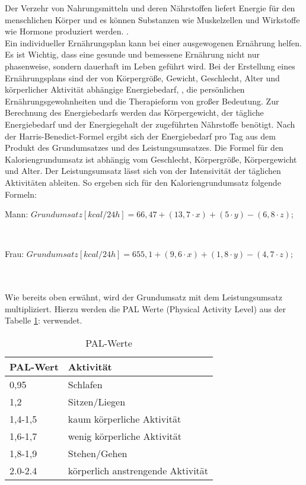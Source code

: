 		Der Verzehr von Nahrungsmitteln und deren Nährstoffen liefert Energie für den menschlichen Körper und es können Substanzen wie Muskelzellen und Wirkstoffe wie Hormone produziert werden. .\cite{ND}\\
		Ein individueller Ernährungsplan kann bei einer ausgewogenen Ernährung helfen. Es ist Wichtig, dass eine gesunde und bemessene Ernährung nicht nur phasenweise, sondern dauerhaft im Leben geführt wird. Bei der Erstellung eines Ernährungsplans sind der von Körpergröße, Gewicht, Geschlecht, Alter und körperlicher Aktivität abhängige  Energiebedarf, , die persönlichen Ernährungsgewohnheiten und die Therapieform  von großer Bedeutung. Zur Berechnung des Energiebedarfs werden das Körpergewicht, der tägliche Energiebedarf und der Energiegehalt der zugeführten Nährstoffe benötigt.\cite{SG} \newline
		Nach der Harris-Benedict-Formel ergibt sich der Energiebedarf pro Tag aus dem Produkt des Grundumsatzes und des Leistungsumsatzes. Die Formel für den Kaloriengrundumsatz ist abhängig vom Geschlecht, Körpergröße, Körpergewicht und Alter. Der Leistungsumsatz lässt sich von der Intensivität der täglichen Aktivitäten ableiten. So ergeben sich für den Kaloriengrundumsatz folgende Formeln: \newline
		\\
		\centerline{Mann: $Grundumsatz [kcal/ 24h] {=} 66,47 + (13,7 \cdot x) + (5 \cdot y) - (6,8 \cdot z)$;}\\
		\centerline{Frau: $Grundumsatz [kcal/ 24h] {=} 655,1 + (9,6 \cdot x) + (1,8 \cdot y) - (4,7 \cdot z)$;}\\
		\noindent\hspace*{16mm}{x = Körpergewicht [kg];}\newline
		\noindent\hspace*{16mm}{y = Körpergröße [cm];}\newline
		\noindent{}\newline
		\\
	Wie  bereits oben erwähnt, wird der Grundumsatz mit dem Leistungsumsatz multipliziert. Hierzu werden die PAL Werte (Physical Activity Level) aus der Tabelle \ref{tab:PAL-Werte}:  verwendet.\cite{SG}
	\begin{table}[H]
		\setlength{\tabcolsep}{12pt}
		\centering
		\begin{tabular}{ll}
			\toprule
			\textbf{PAL-Wert} & \textbf{Aktivität}\\
			\midrule
			0,95 & Schlafen\\
			1,2 & Sitzen/Liegen\\
			1,4-1,5 & kaum körperliche Aktivität\\
			1,6-1,7 & wenig körperliche Aktivität\\
			1,8-1,9 & Stehen/Gehen\\
			2.0-2.4 & körperlich anstrengende Aktivität\\
			\bottomrule
		\end{tabular}
		\captionsetup{justification=centering}
		\caption{PAL-Werte}
		\label{tab:PAL-Werte}
	\end{table}
